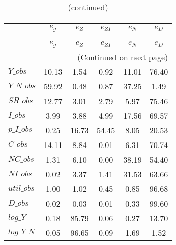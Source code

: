  
\begin{center}
\begin{longtable}{lccccc} 
\caption{VARIANCE DECOMPOSITION (in percent)}\\
 \label{Table:th_var_decomp_uncond}\\
\toprule 
$           $	 & 	 $       {e_g}$	 & 	 $       {e_Z}$	 & 	 $    {e_{ZI}}$	 & 	 $       {e_N}$	 & 	 $       {e_D}$\\
\midrule \endfirsthead 
\caption{(continued)}\\
 \toprule \\ 
$           $	 & 	 $       {e_g}$	 & 	 $       {e_Z}$	 & 	 $    {e_{ZI}}$	 & 	 $       {e_N}$	 & 	 $       {e_D}$\\
\midrule \endhead 
\midrule \multicolumn{6}{r}{(Continued on next page)} \\ \bottomrule \endfoot 
\bottomrule \endlastfoot 
$Y\_obs     $	 & 	       10.13	 & 	        1.54	 & 	        0.92	 & 	       11.01	 & 	       76.40 \\ 
$Y\_N\_obs  $	 & 	       59.92	 & 	        0.48	 & 	        0.87	 & 	       37.25	 & 	        1.49 \\ 
$SR\_obs    $	 & 	       12.77	 & 	        3.01	 & 	        2.79	 & 	        5.97	 & 	       75.46 \\ 
$I\_obs     $	 & 	        3.99	 & 	        3.88	 & 	        4.99	 & 	       17.56	 & 	       69.57 \\ 
$p\_I\_obs  $	 & 	        0.25	 & 	       16.73	 & 	       54.45	 & 	        8.05	 & 	       20.53 \\ 
$C\_obs     $	 & 	       14.11	 & 	        8.84	 & 	        0.01	 & 	        6.31	 & 	       70.74 \\ 
$NC\_obs    $	 & 	        1.31	 & 	        6.10	 & 	        0.00	 & 	       38.19	 & 	       54.40 \\ 
$NI\_obs    $	 & 	        0.02	 & 	        3.37	 & 	        1.41	 & 	       31.53	 & 	       63.66 \\ 
$util\_obs  $	 & 	        1.00	 & 	        1.02	 & 	        0.45	 & 	        0.85	 & 	       96.68 \\ 
$D\_obs     $	 & 	        0.02	 & 	        0.03	 & 	        0.01	 & 	        0.33	 & 	       99.60 \\ 
$log\_Y     $	 & 	        0.18	 & 	       85.79	 & 	        0.06	 & 	        0.27	 & 	       13.70 \\ 
$log\_Y\_N  $	 & 	        0.05	 & 	       96.65	 & 	        0.09	 & 	        1.69	 & 	        1.52 \\ 

\end{longtable}
\end{center}
